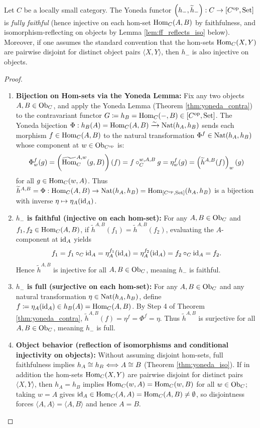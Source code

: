 \documentclass[10pt,a4paper]{article}
\renewcommand{\myprf}{\begin{proof}}
\renewcommand{\myqed}{\end{proof}}
\begin{document}
\begin{theorem}\label{thm:yoneda_emb}
Let $C$ be a locally small category. The Yoneda functor $\left(h_-, \widetilde{h}_-\right) : C \to [C^{\textrm{op}}, {\textrm{Set}}]$ is \emph{fully faithful} (hence injective on each hom-set ${\textrm{Hom}}_C(A, B)$ by faithfulness, and isomorphism-reflecting on objects by Lemma \ref{lem:ff_reflects_iso} below). Moreover, if one assumes the standard convention that the hom-sets ${\textrm{Hom}}_C(X, Y)$ are pairwise disjoint for distinct object pairs $\langle X, Y \rangle$, then $h_-$ is also injective on objects.
\end{theorem}
\myprf
\begin{enumerate}
\item \textbf{Bijection on Hom-sets via the Yoneda Lemma:}
Fix any two objects $A, B \in {\textrm{Ob}}_C$, and apply the Yoneda Lemma (Theorem \ref{thm:yoneda_contra}) to the contravariant functor $G \coloneqq h_B = {\textrm{Hom}}_C(-,B) \in [C^{\textrm{op}}, {\textrm{Set}}]$.
The Yoneda bijection $\Phi : h_B(A) = {\textrm{Hom}}_C(A,B) \xrightarrow{\sim} {\textrm{Nat}}(h_A, h_B)$ sends each morphism $f \in {\textrm{Hom}}_C(A,B)$ to the natural transformation $\Phi^f \in {\textrm{Nat}}(h_A, h_B)$ whose component at $w \in {\textrm{Ob}}_{C^{\textrm{op}}}$ is:
$$\Phi^f_w(g) = \left({\widetilde{{\textrm{Hom}}}\textrm{}}_C^{A,w}(g, B)\right)(f) = f \circ_C^{w,A,B} g = \eta^f_w(g) = \left(\widetilde{h}^{A,B}(f)\right)_w(g)$$
for all $g \in {\textrm{Hom}}_C(w,A)$. Thus $\widetilde{h}^{A,B} = \Phi : {\textrm{Hom}}_C(A,B) \to {\textrm{Nat}}(h_A, h_B) = {\textrm{Hom}}_{[C^{\textrm{op}},{\textrm{Set}}]}(h_A, h_B)$ is a bijection with inverse $\eta \mapsto \eta_A({\textrm{id}}_A)$.

\item \textbf{$h_-$ is faithful (injective on each hom-set):}
For any $A, B \in {\textrm{Ob}}_C$ and $f_1, f_2 \in {\textrm{Hom}}_C(A,B)$, if $\widetilde{h}^{A,B}(f_1) = \widetilde{h}^{A,B}(f_2)$, evaluating the $A$-component at ${\textrm{id}}_A$ yields
$$f_1 = f_1 \circ_C {\textrm{id}}_A = \eta^{f_1}_A({\textrm{id}}_A) = \eta^{f_2}_A({\textrm{id}}_A) = f_2 \circ_C {\textrm{id}}_A = f_2.$$
Hence $\widetilde{h}^{A,B}$ is injective for all $A,B \in {\textrm{Ob}}_C$, meaning $h_-$ is faithful.

\item \textbf{$h_-$ is full (surjective on each hom-set):}
For any $A, B \in {\textrm{Ob}}_C$ and any natural transformation $\eta \in {\textrm{Nat}}(h_A, h_B)$, define $f \coloneqq \eta_A({\textrm{id}}_A) \in h_B(A) = {\textrm{Hom}}_C(A,B)$. By Step 4 of Theorem \ref{thm:yoneda_contra}, $\widetilde{h}^{A,B}(f) = \eta^f = \Phi^f = \eta$. Thus $\widetilde{h}^{A,B}$ is surjective for all $A,B \in {\textrm{Ob}}_C$, meaning $h_-$ is full.

\item \textbf{Object behavior (reflection of isomorphisms and conditional injectivity on objects):}
Without assuming disjoint hom-sets, full faithfulness implies $h_A \cong h_B \Longleftrightarrow A \cong B$ (Theorem \ref{thm:yoneda_iso}). If in addition the hom-sets ${\textrm{Hom}}_C(X,Y)$ are pairwise disjoint for distinct pairs $\langle X, Y \rangle$, then $h_A = h_B$ implies ${\textrm{Hom}}_C(w,A) = {\textrm{Hom}}_C(w,B)$ for all $w \in {\textrm{Ob}}_C$; taking $w = A$ gives ${\textrm{id}}_A \in {\textrm{Hom}}_C(A,A) = {\textrm{Hom}}_C(A,B) \neq \emptyset$, so disjointness forces $\langle A, A \rangle = \langle A, B \rangle$ and hence $A = B$.
\end{enumerate}
\myqed
\end{document}
